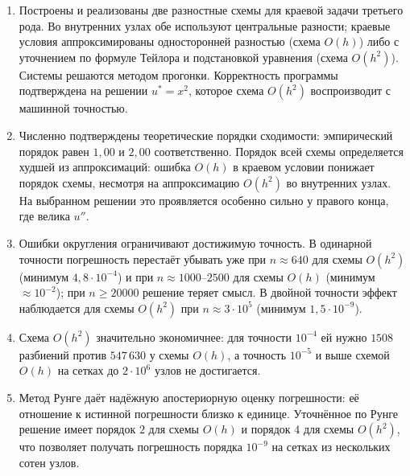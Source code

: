 \documentclass[12pt,a4paper]{article}
\begin{document}
\begin{enumerate}
\item Построены и реализованы две разностные схемы для краевой задачи
третьего рода. Во внутренних узлах обе используют центральные
разности; краевые условия аппроксимированы односторонней разностью
(схема $O(h)$) либо с уточнением по формуле Тейлора и подстановкой
уравнения (схема $O(h^2)$). Системы решаются методом прогонки.
Корректность программы подтверждена на решении $u^{\ast}=x^2$, которое
схема $O(h^2)$ воспроизводит с машинной точностью.

\item Численно подтверждены теоретические порядки сходимости:
эмпирический порядок равен $1{,}00$ и $2{,}00$ соответственно. Порядок
всей схемы определяется худшей из аппроксимаций: ошибка $O(h)$ в
краевом условии понижает порядок схемы, несмотря на аппроксимацию
$O(h^2)$ во внутренних узлах. На выбранном решении это проявляется
особенно сильно у правого конца, где велика $u''$.

\item Ошибки округления ограничивают достижимую точность. В одинарной
точности погрешность перестаёт убывать уже при $n\approx640$ для схемы
$O(h^2)$ (минимум $4{,}8\cdot10^{-4}$) и при $n\approx1000$--$2500$ для
схемы $O(h)$ (минимум $\approx10^{-2}$); при $n\ge 20000$ решение теряет
смысл. В двойной точности эффект наблюдается для схемы $O(h^2)$ при
$n\approx3\cdot10^5$ (минимум $1{,}5\cdot10^{-9}$).

\item Схема $O(h^2)$ значительно экономичнее: для точности $10^{-4}$ ей
нужно $1508$ разбиений против $547\,630$ у схемы $O(h)$, а точность
$10^{-5}$ и выше схемой $O(h)$ на сетках до $2\cdot10^6$ узлов не
достигается.

\item Метод Рунге даёт надёжную апостериорную оценку погрешности: её
отношение к истинной погрешности близко к единице. Уточнённое по Рунге
решение имеет порядок $2$ для схемы $O(h)$ и порядок $4$ для схемы
$O(h^2)$, что позволяет получать погрешность порядка $10^{-9}$ на сетках
из нескольких сотен узлов.
\end{enumerate}
\end{document}
